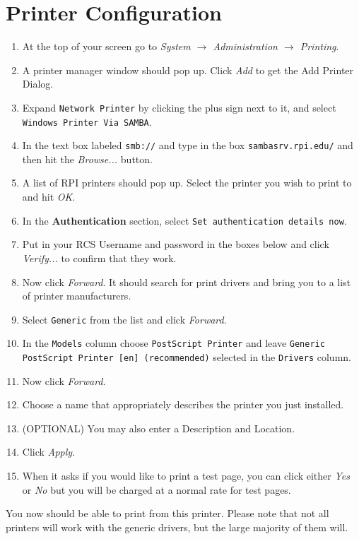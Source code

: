 \documentclass[12pt, letter]{article}
\begin{document}
\section{Printer Configuration}
\begin{enumerate}
\item At the top of your screen go to \emph{System $\rightarrow$ Administration $\rightarrow$ Printing}. 
\item A printer manager window should pop up. Click \emph{Add} to get the Add Printer Dialog. 
\item Expand \texttt{Network Printer} by clicking the plus sign next to it, and select \texttt{Windows Printer Via SAMBA}. 
\item In the text box labeled \texttt{smb://} and type in the box \texttt{sambasrv.rpi.edu/} and then hit the \emph{Browse...} button. 
\item A list of RPI printers should pop up. Select the printer you wish to print to and hit \emph{OK}. 
\item In the {\bf Authentication} section, select \texttt{Set authentication details now}. 
\item Put in your RCS Username and password in the boxes below and click \emph{Verify...} to confirm that they work.
\item Now click \emph{Forward}. It should search for print drivers and bring you to a list of printer manufacturers. 
\item Select \texttt{Generic} from the list and click \emph{Forward}. 
\item In the \texttt{Models} column choose \texttt{PostScript Printer} and leave \texttt{Generic PostScript Printer [en] (recommended)} selected in the \texttt{Drivers} column. 
\item Now click \emph{Forward}.
\item Choose a name that appropriately describes the printer you just installed.
\item (OPTIONAL) You may also enter a Description and Location.
\item Click \emph{Apply}. 
\item When it asks if you would like to print a test page, you can click either \emph{Yes} or \emph{No} but you will be charged at a normal rate for test pages.
\end{enumerate}
You now should be able to print from this printer. Please note that not all printers will work with the generic drivers, but the large majority of them will.
\end{document}
